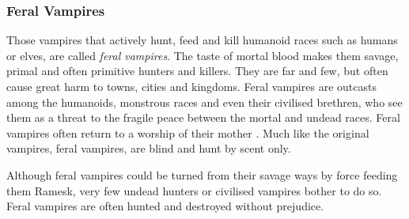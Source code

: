 \subsubsection{Feral Vampires}
\label{sec:Feral Vampires}

Those vampires that actively hunt, feed and kill humanoid races such as
humans or elves, are called \emph{feral vampires}. The taste of mortal blood
makes them savage, primal and often primitive hunters and killers. They are
far and few, but often cause great harm to towns, cities and kingdoms. Feral
vampires are outcasts among the humanoids, monstrous races and even their
civilised brethren, who see them as a threat to the fragile peace between the
mortal and undead races. Feral vampires often return to a worship of their
mother . Much like the original vampires, feral vampires,
are blind and hunt by scent only.

Although feral vampires could be turned from their savage ways by force
feeding them Ramesk, very few undead hunters or civilised vampires bother to
do so. Feral vampires are often hunted and destroyed without prejudice.

